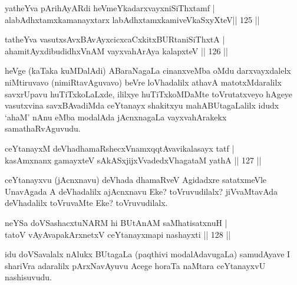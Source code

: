 
\begin{shl}
yatheYva pArihAyARdi heVmeYkadarxvayxniSiThxtamf | \\
alabAdhxtamxkamanayxtarx labAdhxtamxkamiveVkaSxyXteV\hfill ||  125 ||  
\end{shl}
				
\begin{shl}
tatheYva vasutxsAvxBAvAyxcicxcaCxkitxBURtaniSiThxtA  | \\
ahamitAyxdibudidhxVnAM vayxvahArAya kalapxteV \hfill||  126 ||  
\end{shl}

\begin{artha}
heVge (kaTaka kuMDalAdi) ABaraNagaLa cinanxveMba oMdu darxvayxdalelx niMtiruvavo (nimiRtavAguvavo) beVre loVhadalilx athavA matotxMdaralilx savxrUpavu huTiTxkoLaLxde, ililxye huTiTxkoMDaMte toVrutatxveyo hAgeye vasutxvina savxBAvadiMda ceYtanayx shakitxyu mahABUtagaLalilx idudx `ahaM' nAnu eMba modalAda jAcnxnagaLa vayxvahArakekx samathaRvAguvudu.
\end{artha}


\begin{shl}
ceYtanayxM deVhadhamaRshecxVnamxqqtAvavikalasayx tatf | \\
kasAmxnanx gamayxteV sAkASxjijxVvadedxVhagataM yathA \hfill||  127 ||  
\end{shl}

\begin{artha}
ceYtanayxvu (jAcnxnavu) deVhada dhamaRveV Agidadxre satatxmeVle UnavAgada A deVhadalilx ajAcnxnavu Eke? toVruvudilalx? jiVvaMtavAda deVhadalilx toVruvaMte Eke? toVruvudilalx.
\end{artha}


\begin{shl}
neYSa doVSashacxtuNARM hi BUtAnAM saMhatisatxnuH | \\
tatoV vAyAvapakArxnetxV ceYtanayxmapi nashayxti \hfill||  128 ||  
\end{shl}

\begin{artha}
idu doVSavalalx nAlukx BUtagaLa (paqthivi modalAdavugaLa) samudAyave I shariVra adaralilx pArxNavAyuvu Acege horaTa naMtara ceYtanayxvU nashisuvudu. 
\end{artha}



